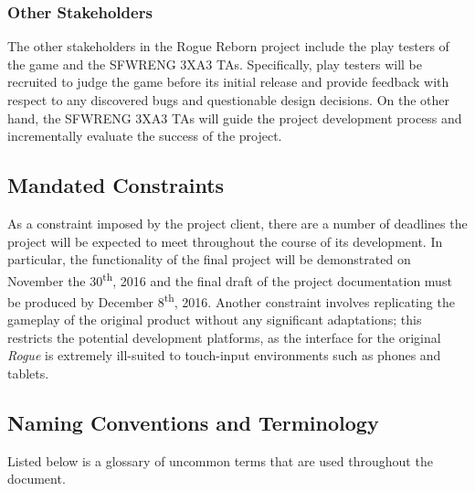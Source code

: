 \documentclass[12pt, titlepage]{article}
\begin{document}
		\subsubsection{Other Stakeholders}

		The other stakeholders in the Rogue Reborn project include the play testers of the game and the SFWRENG 3XA3 TAs.  Specifically, play testers will be recruited to judge the game before its initial release and provide feedback with respect to any discovered bugs and questionable design decisions.  On the other hand, the SFWRENG 3XA3 TAs will guide the project development process and incrementally evaluate the success of the project.

	\subsection{Mandated Constraints}

		As a constraint imposed by the project client, there are a number of deadlines the project will be expected to meet throughout the course of its development. In particular, the functionality of the final project will be demonstrated on November the 30\textsuperscript{th}, 2016 and the final draft of the project documentation must be produced by December 8\textsuperscript{th}, 2016.  Another constraint involves replicating the gameplay of the original product without any significant adaptations; this restricts the potential development platforms, as the interface for the original \textit{Rogue} is extremely ill-suited to touch-input environments such as phones and tablets. 

	\subsection{Naming Conventions and Terminology}

	Listed below is a glossary of uncommon terms that are used throughout the document. 
\end{document}
